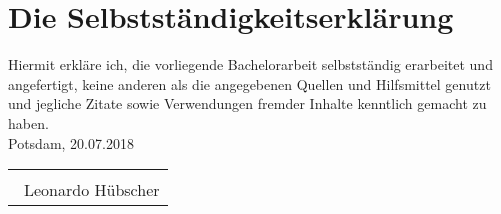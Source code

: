 \section*{Die Selbstständigkeitserklärung}
\label{sec:selbstständigkeitserklärung}

Hiermit erkläre ich, die vorliegende Bachelorarbeit selbstständig erarbeitet und angefertigt, keine anderen als die
angegebenen Quellen und Hilfsmittel genutzt und jegliche Zitate sowie Verwendungen fremder Inhalte kenntlich gemacht
zu haben.
\vspace{0.5 cm}
\bigskip \\
Potsdam, 20.07.2018
\vspace{1 cm}
\begin{flushleft}
    \begin{tabular}{@{}L{7cm}}
        \dotfill \\
        ~Leonardo Hübscher
    \end{tabular}
\end{flushleft}